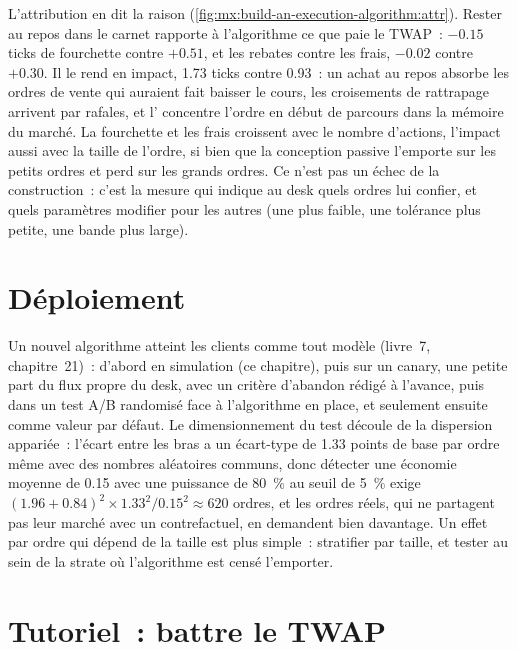 L'attribution en dit la raison (\cref{fig:mx:build-an-execution-algorithm:attr}). Rester au repos dans le carnet rapporte à l'algorithme ce que paie le TWAP~: $-0.15$ ticks de
fourchette contre $+0.51$, et les rebates contre les frais, $-0.02$ contre $+0.30$. Il le rend en impact, 1.73 ticks contre 0.93~: un achat au repos absorbe les
ordres de vente qui auraient fait baisser le cours, les croisements de rattrapage arrivent par rafales, et l' concentre l'ordre en début de parcours dans la mémoire du marché.
La fourchette et les frais croissent avec le nombre d'actions, l'impact aussi avec la taille de l'ordre, si bien que la conception passive l'emporte sur les petits ordres et perd sur les
grands ordres. Ce n'est pas un échec de la construction~: c'est la mesure qui indique au desk quels ordres lui confier, et quels paramètres modifier pour les
autres (une  plus faible, une tolérance plus petite, une bande plus large).

\section{Déploiement}

Un nouvel algorithme atteint les clients comme tout modèle (livre~7, chapitre~21)~: d'abord en simulation (ce chapitre), puis sur un canary, une petite part
du flux propre du desk, avec un critère d'abandon rédigé à l'avance, puis dans un test A/B randomisé face à l'algorithme en place, et seulement ensuite comme valeur par défaut. Le
dimensionnement du test découle de la dispersion appariée~: l'écart entre les bras a un écart-type de 1.33 points de base par ordre même avec
des nombres aléatoires communs, donc détecter une économie moyenne de 0.15 avec une puissance de 80~\% au seuil de 5~\% exige $(1.96 + 0.84)^2 \times 1.33^2 / 0.15^2
\approx 620$ ordres, et les ordres réels, qui ne partagent pas leur marché avec un contrefactuel, en demandent bien davantage. Un effet par ordre qui dépend de la taille
est plus simple~: stratifier par taille, et tester au sein de la strate où l'algorithme est censé l'emporter.

\section{Tutoriel~: battre le TWAP}\label{tut:mx:build-an-execution-algorithm:tut}

